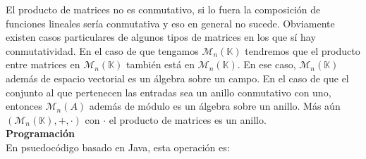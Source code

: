 El producto de matrices no es conmutativo, si lo fuera la composición de funciones lineales sería conmutativa y eso en general no sucede. Obviamente existen casos particulares de algunos tipos de matrices en los que sí hay conmutatividad. En el caso de que tengamos $\mathcal{M}_n(\mathbb{K})$ tendremos que el producto entre matrices en $\mathcal{M}_n(\mathbb{K})$ también está en $\mathcal{M}_n(\mathbb{K})$. En ese caso, $\mathcal{M}_n(\mathbb{K})$ además de espacio vectorial es un álgebra sobre un campo. En el caso de que el conjunto al que pertenecen las entradas sea un anillo conmutativo con uno, entonces $\mathcal{M}_n(A)$ además de módulo es un álgebra sobre un anillo. Más aún $(\mathcal{M}_n(\mathbb{K}), +, \cdot)$ con $\cdot$ el producto de matrices es un anillo. \\

\noindent\textbf{Programación} \\

En psuedocódigo basado en Java, esta operación es:

